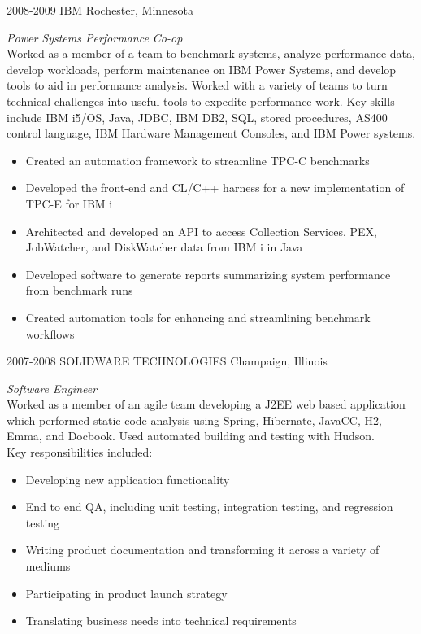 \documentclass{friggeri-cv} %
\begin{document}
\begin{entrylist}
\entry
{2008-2009}
{IBM}
{Rochester, Minnesota}
{\emph{Power Systems Performance Co-op} \\
Worked as a member of a team to benchmark systems, analyze performance data, develop workloads, perform
maintenance on IBM Power Systems, and develop tools to aid in performance analysis. Worked with a variety of teams to turn technical challenges into useful tools to expedite performance work. Key skills include IBM i5/OS, Java, JDBC, IBM DB2, SQL, stored procedures, AS400 control language, IBM Hardware Management Consoles, and IBM Power systems. 
\begin{itemize}
\item Created an automation framework to streamline TPC-C benchmarks
\item Developed the front-end and CL/C++ harness for a new implementation of TPC-E for IBM i
\item Architected and developed an API to access Collection Services, PEX, JobWatcher, and DiskWatcher data from IBM i in Java
\item Developed software to generate reports summarizing system performance from benchmark runs
\item Created automation tools for enhancing and streamlining benchmark workflows
\end{itemize}}
\end{entrylist}
\begin{entrylist}
\entry
{2007-2008}
{SOLIDWARE TECHNOLOGIES}
{Champaign, Illinois}
{\emph{Software Engineer} \\
Worked as a member of an agile team developing a J2EE web based application which performed static code analysis using Spring, Hibernate, JavaCC, H2, Emma, and Docbook. Used automated building and testing with Hudson. \\
Key responsibilities included:
\begin{itemize}
\item Developing new application functionality
\item End to end QA, including unit testing, integration testing, and regression testing
\item Writing product documentation and transforming it across a variety of mediums
\item Participating in product launch strategy
\item Translating business needs into technical requirements
\end{itemize}}
\end{entrylist}
\pagebreak
\end{document}
